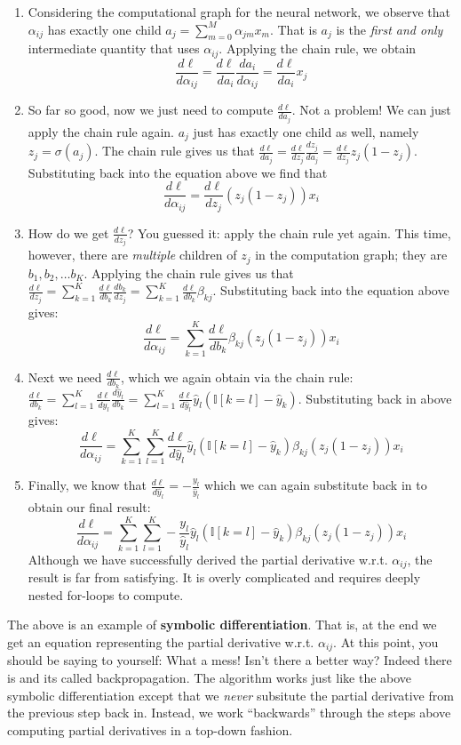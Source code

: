\documentclass[11pt]{exam}
\numberwithin{equation}{section} %
\numberwithin{figure}{section} %
\numberwithin{table}{section} %
\newcommand{\adj}[1]{\frac{d \ell}{d #1}}
\newcommand{\chain}[2]{\adj{#2} = \adj{#1}\frac{d #1}{d #2}}
\newcommand{\Ib}{\mathbb{I}}
\begin{document}
\begin{enumerate}
    \item Considering the computational graph for the neural network, we observe that $\alpha_{ij}$ has exactly one child $a_j = \sum_{m=0}^M \alpha_{jm} x_m$. That is $a_j$ is the \emph{first and only} intermediate quantity that uses $\alpha_{ij}$. Applying the chain rule, we obtain 
        \[ \chain{a_i}{\alpha_{ij}} = \adj{a_i} x_j \] 
    \item So far so good, now we just need to compute $\adj{a_j}$. Not a problem! We can just apply the chain rule again. $a_j$ just has exactly one child as well, namely $z_j = \sigma(a_j)$. The chain rule gives us that $\chain{z_j}{a_j} = \adj{z_j} z_j (1 - z_j)$. Substituting back into the equation above we find that 
        \[ \adj{\alpha_{ij}} = \adj{z_j} (z_j (1-z_j)) x_i \]
    \item How do we get $\adj{z_j}$? You guessed it: apply the chain rule yet again. This time, however, there are \emph{multiple} children of $z_j$ in the computation graph; they are $b_1, b_2, \ldots b_K$. Applying the chain rule gives us that $\adj{z_j} = \sum_{k=1}^K \adj{b_k}\frac{d b_k}{d z_j} = \sum_{k=1}^K \adj{b_k}\beta_{kj}$. Substituting back into the equation above gives:
        \[ \adj{\alpha_{ij}} = \sum_{k=1}^K \adj{b_k}\beta_{kj} (z_j (1-z_j)) x_i \]
    \item Next we need $\adj{b_k}$, which we again obtain via the chain rule: $\adj{b_k} = \sum_{l=1}^K \adj{\hat{y}_l} \frac{d \hat{y}_l}{d b_k} = \sum_{l=1}^K \adj{\hat{y}_l} \hat{y}_l (\Ib[k=l] - \hat{y}_k)$. Substituting back in above gives:
        \[ \adj{\alpha_{ij}} = \sum_{k=1}^K \sum_{l=1}^K \adj{\hat{y}_l} \hat{y}_l (\Ib[k=l] - \hat{y}_k) \beta_{kj} (z_j (1-z_j)) x_i \]
    \item Finally, we know that $\adj{\hat{y}_l} = - \frac{y_l}{\hat{y}_l}$ which we can again substitute back in to obtain our final result:
        \[ \adj{\alpha_{ij}} = \sum_{k=1}^K \sum_{l=1}^K - \frac{y_l}{\hat{y}_l} \hat{y}_l (\Ib[k=l] - \hat{y}_k) \beta_{kj} (z_j (1-z_j)) x_i \]
    Although we have successfully derived the partial derivative w.r.t. $\alpha_{ij}$, the result is far from satisfying. It is overly complicated and requires deeply nested for-loops to compute.
\end{enumerate}

The above is an example of {\bf symbolic differentiation}. That is, at the end we get an equation representing the partial derivative w.r.t. $\alpha_{ij}$. At this point, you should be saying to yourself: What a mess! Isn't there a better way? Indeed there is and its called backpropagation. The algorithm works just like the above symbolic differentiation except that we \textit{never} subsitute the partial derivative from the previous step back in. Instead, we work ``backwards'' through the steps above computing partial derivatives in a top-down fashion. 
\end{document}
